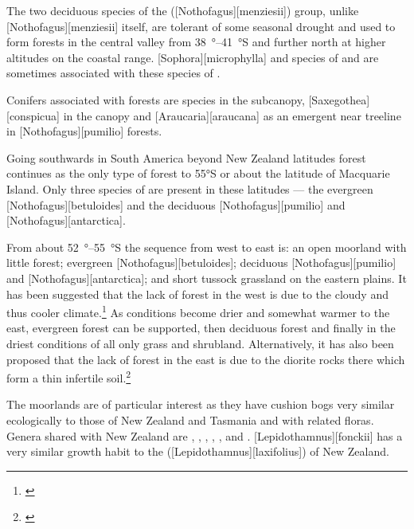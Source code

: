 The two deciduous species of the  ([Nothofagus][menziesii]) group, unlike [Nothofagus][menziesii] itself, are tolerant of some seasonal drought and used to form forests in the central valley from \SIrange{38}{41}{\degree}S and further north at higher altitudes on the coastal range.
[Sophora][microphylla] and species of  and  are sometimes associated with these species of .

Conifers associated with  forests are  species in the subcanopy, [Saxegothea][conspicua] in the canopy and [Araucaria][araucana] as an emergent near treeline in [Nothofagus][pumilio] forests.

Going southwards in South America beyond New Zealand latitudes  forest continues as the only type of forest to \ang{55}S or about the latitude of Macquarie Island.
Only three species of  are present in these latitudes --- the evergreen [Nothofagus][betuloides] and the deciduous [Nothofagus][pumilio] and [Nothofagus][antarctica].

From about \SIrange{52}{55}{\degree}S the sequence from west to east is: an open moorland with little forest; evergreen [Nothofagus][betuloides]; deciduous [Nothofagus][pumilio] and [Nothofagus][antarctica]; and short tussock grassland on the eastern plains.
It has been suggested that the lack of forest in the west is due to the cloudy and thus cooler climate.\footnote{\cite{mcqueen1976ecology}}
As conditions become drier and somewhat warmer to the east, evergreen  forest can be supported, then deciduous  forest and finally in the driest conditions of all only grass and shrubland.
Alternatively, it has also been proposed that the lack of forest in the east is due to the diorite rocks there which form a thin infertile soil.\footnote{\cite{godley1960botany}}

The moorlands are of particular interest as they have cushion bogs very similar ecologically to those of New Zealand and Tasmania and with related floras.
Genera shared with New Zealand are , , , , ,  and .
[Lepidothamnus][fonckii] has a very similar growth habit to the  ([Lepidothamnus][laxifolius]) of New Zealand.


